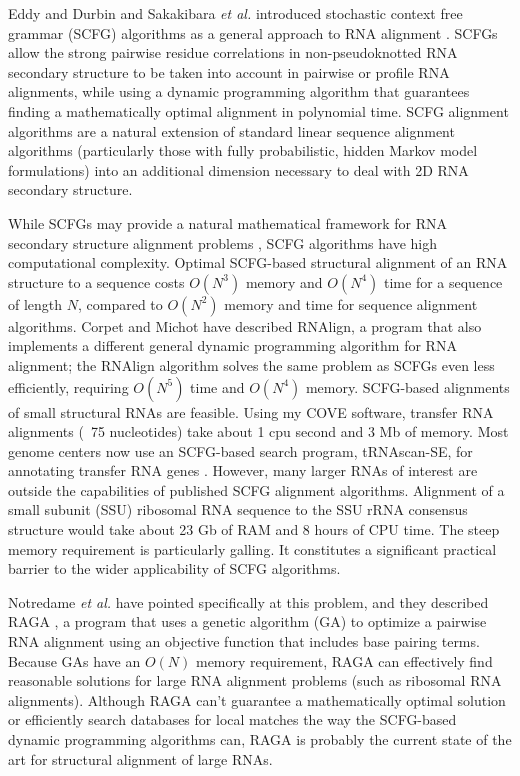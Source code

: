 Eddy and Durbin and Sakakibara \emph{et al.} introduced stochastic
context free grammar (SCFG) algorithms as a general approach to RNA
alignment \cite{Eddy94,Sakakibara94c,Durbin98}. SCFGs allow the strong
pairwise residue correlations in non-pseudoknotted RNA secondary
structure to be taken into account in pairwise or profile RNA
alignments, while using a dynamic programming algorithm that
guarantees finding a mathematically optimal alignment in polynomial
time. SCFG alignment algorithms are a natural extension of standard
linear sequence alignment algorithms (particularly those with fully
probabilistic, hidden Markov model formulations) into an additional
dimension necessary to deal with 2D RNA secondary structure.

While SCFGs may provide a natural mathematical framework for RNA
secondary structure alignment problems \cite{Durbin98}, SCFG
algorithms have high computational complexity. Optimal SCFG-based
structural alignment of an RNA structure to a sequence costs $O(N^3)$
memory and $O(N^4)$ time for a sequence of length $N$, compared to
$O(N^2)$ memory and time for sequence alignment algorithms. Corpet and
Michot have described RNAlign, a program that also implements a
different general dynamic programming algorithm for RNA alignment; the
RNAlign algorithm solves the same problem as SCFGs even less
efficiently, requiring $O(N^5)$ time and $O(N^4)$ memory.  SCFG-based
alignments of small structural RNAs are feasible. Using my COVE
software, transfer RNA alignments (~75 nucleotides) take about 1 cpu
second and 3 Mb of memory. Most genome centers now use an SCFG-based
search program, tRNAscan-SE, for annotating transfer RNA genes
\cite{LoweEddy97}. However, many larger RNAs of interest are outside
the capabilities of published SCFG alignment algorithms. Alignment of
a small subunit (SSU) ribosomal RNA sequence to the SSU rRNA consensus
structure would take about 23 Gb of RAM and 8 hours of CPU time. The
steep memory requirement is particularly galling. It constitutes a
significant practical barrier to the wider applicability of SCFG
algorithms.


Notredame \emph{et al.} have pointed specifically at this problem, and
they described RAGA \cite{Notredame97}, a program that uses a genetic
algorithm (GA) to optimize a pairwise RNA alignment using an objective
function that includes base pairing terms. Because GAs have an $O(N)$
memory requirement, RAGA can effectively find reasonable solutions for
large RNA alignment problems (such as ribosomal RNA
alignments). Although RAGA can't guarantee a mathematically optimal
solution or efficiently search databases for local matches the way the
SCFG-based dynamic programming algorithms can, RAGA is probably the
current state of the art for structural alignment of large RNAs.

